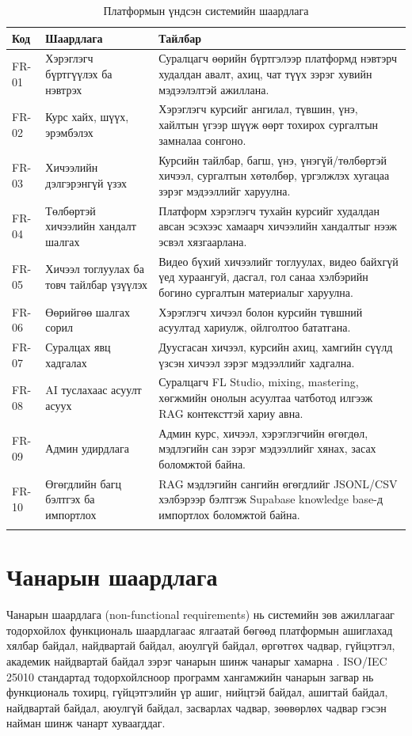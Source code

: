 \begin{longtable}{|p{}|p{}|p{}|}
  \hline
  \textbf{Код} & \textbf{Шаардлага} & \textbf{Тайлбар} \\ \hline
  FR-01 & Хэрэглэгч бүртгүүлэх ба нэвтрэх & Суралцагч өөрийн бүртгэлээр платформд нэвтэрч худалдан авалт, ахиц, чат түүх зэрэг хувийн мэдээлэлтэй ажиллана. \\ \hline
  FR-02 & Курс хайх, шүүх, эрэмбэлэх & Хэрэглэгч курсийг ангилал, түвшин, үнэ, хайлтын үгээр шүүж өөрт тохирох сургалтын замналаа сонгоно. \\ \hline
  FR-03 & Хичээлийн дэлгэрэнгүй үзэх & Курсийн тайлбар, багш, үнэ, үнэгүй/төлбөртэй хичээл, сургалтын хөтөлбөр, үргэлжлэх хугацаа зэрэг мэдээллийг харуулна. \\ \hline
  FR-04 & Төлбөртэй хичээлийн хандалт шалгах & Платформ хэрэглэгч тухайн курсийг худалдан авсан эсэхээс хамаарч хичээлийн хандалтыг нээж эсвэл хязгаарлана. \\ \hline
  FR-05 & Хичээл тоглуулах ба товч тайлбар үзүүлэх & Видео бүхий хичээлийг тоглуулах, видео байхгүй үед хураангуй, дасгал, гол санаа хэлбэрийн богино сургалтын материалыг харуулна. \\ \hline
  FR-06 & Өөрийгөө шалгах сорил & Хэрэглэгч хичээл болон курсийн түвшний асуултад хариулж, ойлголтоо бататгана. \\ \hline
  FR-07 & Суралцах явц хадгалах & Дуусгасан хичээл, курсийн ахиц, хамгийн сүүлд үзсэн хичээл зэрэг мэдээллийг хадгална. \\ \hline
  FR-08 & AI туслахаас асуулт асуух & Суралцагч FL Studio, mixing, mastering, хөгжмийн онолын асуултаа чатботод илгээж RAG контексттэй хариу авна. \\ \hline
  FR-09 & Админ удирдлага & Админ курс, хичээл, хэрэглэгчийн өгөгдөл, мэдлэгийн сан зэрэг мэдээллийг хянах, засах боломжтой байна. \\ \hline
  FR-10 & Өгөгдлийн багц бэлтгэх ба импортлох & RAG мэдлэгийн сангийн өгөгдлийг JSONL/CSV хэлбэрээр бэлтгэж Supabase knowledge base-д импортлох боломжтой байна. \\ \hline
  \caption{Платформын үндсэн системийн шаардлага}
  \label{tab:functional-requirements}
\end{longtable}

\section{Чанарын шаардлага}
Чанарын шаардлага (non-functional requirements) нь системийн зөв ажиллагааг тодорхойлох функциональ шаардлагаас ялгаатай бөгөөд платформын ашиглахад хялбар байдал, найдвартай байдал, аюулгүй байдал, өргөтгөх чадвар, гүйцэтгэл, академик найдвартай байдал зэрэг чанарын шинж чанарыг хамарна \cite{agile_manifesto_2001}. ISO/IEC 25010 стандартад тодорхойлсноор программ хангамжийн чанарын загвар нь функциональ тохирц, гүйцэтгэлийн үр ашиг, нийцтэй байдал, ашигтай байдал, найдвартай байдал, аюулгүй байдал, засварлах чадвар, зөөвөрлөх чадвар гэсэн найман шинж чанарт хуваагддаг.

